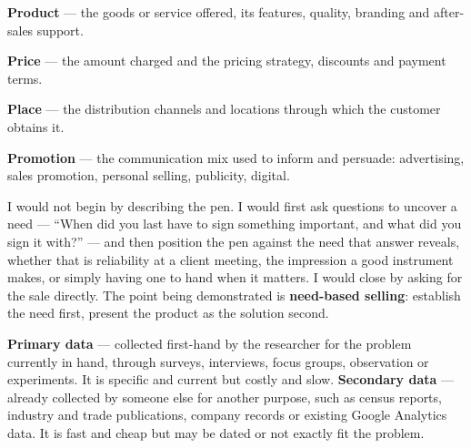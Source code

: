 \begin{qlist}
\begin{apts}
\item \textbf{Product} --- the goods or service offered, its features, quality,
      branding and after-sales support.
\item \textbf{Price} --- the amount charged and the pricing strategy, discounts
      and payment terms.
\item \textbf{Place} --- the distribution channels and locations through which
      the customer obtains it.
\item \textbf{Promotion} --- the communication mix used to inform and persuade:
      advertising, sales promotion, personal selling, publicity, digital.
\end{apts}

I would not begin by describing the pen. I would first ask questions to
uncover a need --- ``When did you last have to sign something important, and
what did you sign it with?'' --- and then position the pen against the need
that answer reveals, whether that is reliability at a client meeting, the
impression a good instrument makes, or simply having one to hand when it
matters. I would close by asking for the sale directly. The point being
demonstrated is \textbf{need-based selling}: establish the need first, present
the product as the solution second.

\textbf{Primary data} --- collected first-hand by the researcher for the
problem currently in hand, through surveys, interviews, focus groups,
observation or experiments. It is specific and current but costly and slow.
\textbf{Secondary data} --- already collected by someone else for another
purpose, such as census reports, industry and trade publications, company
records or existing Google Analytics data. It is fast and cheap but may be
dated or not exactly fit the problem.


\end{qlist}
